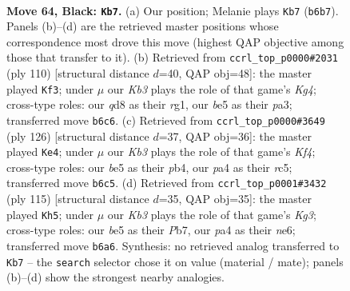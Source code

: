\documentclass[11pt]{article}
\begin{document}
\clearpage

\begin{figure}[p]\centering
\begin{subfigure}{0.46\textwidth}\centering
\resizebox{\linewidth}{!}{%
\newchessgame
\chessboard[
  setfen={3Q4/8/1k6/p2pBp2/P6r/8/8/RN4K1 b - - 9 64},
  showmover=false,
  pgfstyle=straightmove, color=movearrow, markmove={b6-b7}
]}
\caption{}
\end{subfigure}\hfill
\begin{subfigure}{0.46\textwidth}\centering
\resizebox{\linewidth}{!}{%
\newchessgame
\chessboard[
  setfen={8/4bp2/7k/R7/4B1K1/p6P/P7/6r1 w - - 11 56},
  showmover=false,
  pgfstyle=straightmove, color=movearrow, markmove={g4-f3}
]}
\caption{}
\end{subfigure}
\\[4pt]
\begin{subfigure}{0.46\textwidth}\centering
\resizebox{\linewidth}{!}{%
\newchessgame
\chessboard[
  setfen={3k2B1/R5p1/8/2r1b3/1p3K2/1P4P1/8/8 w - - 18 64},
  showmover=false,
  pgfstyle=straightmove, color=movearrow, markmove={f4-e4}
]}
\caption{}
\end{subfigure}\hfill
\begin{subfigure}{0.46\textwidth}\centering
\resizebox{\linewidth}{!}{%
\newchessgame
\chessboard[
  setfen={8/pp6/4NRk1/3bB1p1/8/P6r/1P1K4/8 b - - 9 58},
  showmover=false,
  pgfstyle=straightmove, color=movearrow, markmove={g6-h5}
]}
\caption{}
\end{subfigure}
\caption{\textbf{Move 64, Black: \texttt{Kb7}.} (a) Our position; Melanie plays \texttt{Kb7} (\texttt{b6b7}). Panels (b)--(d) are the retrieved master positions whose correspondence most drove this move (highest QAP objective among those that transfer to it). (b) Retrieved from \texttt{ccrl\_top\_p0000\#2031} (ply 110) [structural distance $d$=40, QAP obj=48]: the master played \texttt{Kf3}; under $\mu$ our \emph{Kb3} plays the role of that game's \emph{Kg4}; cross-type roles: our \emph{q}d8 as their \emph{r}g1, our \emph{b}e5 as their \emph{p}a3; transferred move \texttt{b6c6}. (c) Retrieved from \texttt{ccrl\_top\_p0000\#3649} (ply 126) [structural distance $d$=37, QAP obj=36]: the master played \texttt{Ke4}; under $\mu$ our \emph{Kb3} plays the role of that game's \emph{Kf4}; cross-type roles: our \emph{b}e5 as their \emph{p}b4, our \emph{p}a4 as their \emph{r}c5; transferred move \texttt{b6c5}. (d) Retrieved from \texttt{ccrl\_top\_p0001\#3432} (ply 115) [structural distance $d$=35, QAP obj=35]: the master played \texttt{Kh5}; under $\mu$ our \emph{Kb3} plays the role of that game's \emph{Kg3}; cross-type roles: our \emph{b}e5 as their \emph{P}b7, our \emph{p}a4 as their \emph{n}e6; transferred move \texttt{b6a6}. Synthesis: no retrieved analog transferred to \texttt{Kb7} -- the \texttt{search} selector chose it on value (material / mate); panels (b)--(d) show the strongest nearby analogies.}
\label{fig:thought-m127}
\end{figure}
\end{document}
